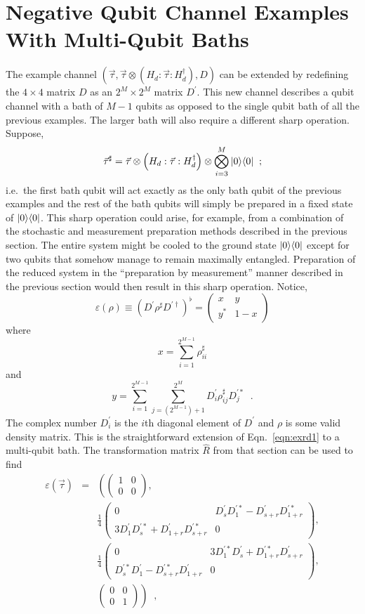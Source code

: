 \section{Negative Qubit Channel Examples With Multi-Qubit Baths}
\label{sec:multibath}

The example channel $(\vec{\tau},\vec{\tau}\otimes \left( H_d:\vec{\tau}:H_d^\dagger\right),D)$ can be extended by redefining the $4\times4$ matrix $D$ as an $2^M\times 2^M$ matrix $D^\prime$.  This new channel describes a qubit channel with a bath of $M-1$ qubits as opposed to the single qubit bath of all the previous examples.  The larger bath will also require a different sharp operation.  Suppose,
$$
\vec{\tau}^\sharp = \vec{\tau}\otimes\left(H_d:\vec{\tau}:H_d^\dagger\right)\otimes\bigotimes_{i=3}^{M}|0\rangle\langle0|\;\;;
$$
i.e.\ the first bath qubit will act exactly as the only bath qubit of the previous examples and the rest of the bath qubits will simply be prepared in a fixed state of $|0\rangle\langle0|$.  This sharp operation could arise, for example, from a combination of the stochastic and measurement preparation methods described in the previous section.  The entire system might be cooled to the ground state $|0\rangle\langle0|$ except for two qubits that somehow manage to remain maximally entangled.  Preparation of the reduced system in the ``preparation by measurement'' manner described in the previous section would then result in this sharp operation.  Notice,
$$
\varepsilon(\rho) \equiv \left(D^\prime \rho^\sharp D^{\prime\dagger}\right)^\flat = \begin{pmatrix}x&y\\y^*&1-x\end{pmatrix}
$$
where
$$
x = \sum_{i=1}^{2^{M-1}} \rho^\sharp_{ii}
$$
and
$$
y = \sum_{i=1}^{2^{M-1}} \sum_{j=(2^{M-1})+1}^{2^M} D^\prime_{i} \rho^\sharp_{ij} D^{\prime *}_j\;\;.
$$
The complex number $D^\prime_i$ is the $i$th diagonal element of $D^\prime$ and $\rho$ is some valid density matrix.  This is the straightforward extension of Eqn.\ \ref{eqn:exrd1} to a multi-qubit bath.  The transformation matrix $\hat{R}$ from that section can be used to find    
\begin{eqnarray*}
\varepsilon(\vec{\tau}) &=& \left(\begin{pmatrix}
1&0\\0&0
\end{pmatrix},\right.\\
& &\frac{1}{4}\begin{pmatrix}
0&D^\prime_s D^{\prime *}_1-D^\prime_{s+r}D^{\prime *}_{1+r}\\
3D^\prime_1 D^{\prime *}_s+D^\prime_{1+r}D^{\prime *}_{s+r}&0
\end{pmatrix},\\
& &\frac{1}{4}\begin{pmatrix}
0&3D^{\prime *}_1 D^{\prime}_s+D^{\prime *}_{1+r}D^{\prime}_{s+r} \\
D^{\prime *}_s D^{\prime}_1-D^{\prime *}_{s+r}D^{\prime}_{1+r}&0
\end{pmatrix},\\
& &\left.\begin{pmatrix}
0&0\\
0&1
\end{pmatrix}\right)\;\;,
\end{eqnarray*}
